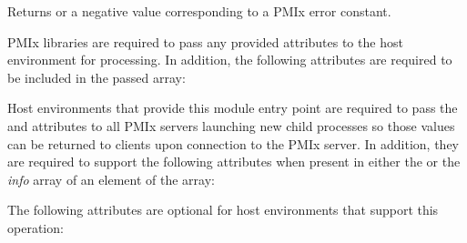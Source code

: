\begin{arglist}
\end{arglist}

Returns  or a negative value corresponding to a PMIx error constant.

\reqattrstart
\ac{PMIx} libraries are required to pass any provided attributes to the host environment for processing. In addition, the following attributes are required to be included in the passed  array:


Host environments that provide this module entry point are required to pass the  and  attributes to all \ac{PMIx} servers launching new child processes so those values can be returned to clients upon connection to the \ac{PMIx} server. In addition, they are required to support the following attributes when present in either the  or the \textit{info} array of an element of the  array:


\reqattrend

\optattrstart
The following attributes are optional for host environments that support this operation:

